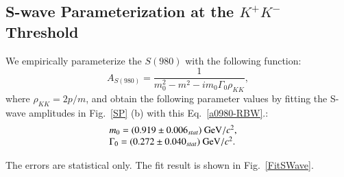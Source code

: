 \subsection{S-wave Parameterization at the $K^{+}K^{-}$ Threshold}
\label{MIPWA-RES}
\par{We empirically parameterize the $S(980)$ with the following function:
    \begin{equation}
        A_{S(980)} = \frac{1}{m_{0}^{2} - m^{2} -im_{0}\Gamma_{0}\rho_{KK}}, \label{a0980-RBW}
    \end{equation}
    where $\rho_{KK} = 2p/m$, and obtain the following parameter values by fitting the S-wave amplitudes in Fig.~\ref{SP} (b) with this Eq.~\ref{a0980-RBW}.:
    \begin{equation}
        \begin{array}{lr}
            m_{0} = (0.919 \pm 0.006_{stat}) \ {\rm GeV}/c^{2}, &\\
            \Gamma_{0} = (0.272 \pm 0.040_{stat}) \ {\rm GeV}/c^{2}. &
        \end{array}\label{S-wave parameters} 
    \end{equation}


    The errors are statistical only. The fit result is shown in Fig.~\ref{FitSWave}.
    
}

